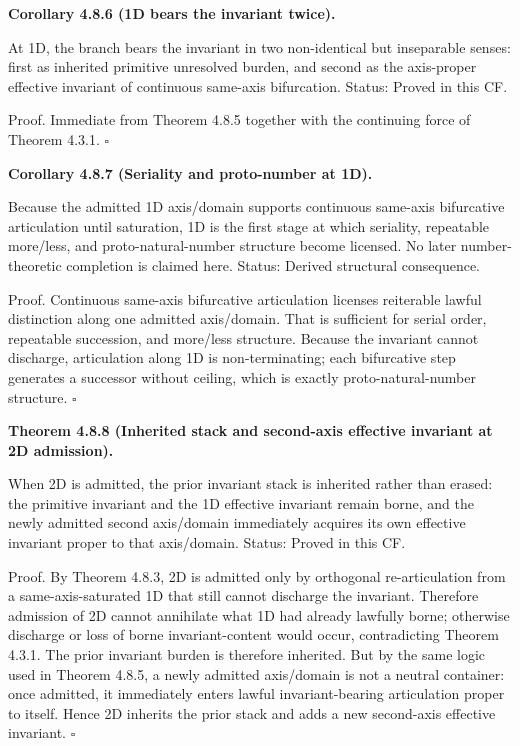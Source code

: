 \documentclass[11pt]{article}
\begin{document}
\textbf{Corollary 4.8.6 (1D bears the invariant twice).}

At 1D, the branch bears the invariant in two non-identical but inseparable senses: first as inherited primitive unresolved burden, and second as the axis-proper effective invariant of continuous same-axis bifurcation. Status: Proved in this CF.

Proof. Immediate from Theorem 4.8.5 together with the continuing force of Theorem 4.3.1. $\square$

\textbf{Corollary 4.8.7 (Seriality and proto-number at 1D).}

Because the admitted 1D axis/domain supports continuous same-axis bifurcative articulation until saturation, 1D is the first stage at which seriality, repeatable more/less, and proto-natural-number structure become licensed. No later number-theoretic completion is claimed here. Status: Derived structural consequence.

Proof. Continuous same-axis bifurcative articulation licenses reiterable lawful distinction along one admitted axis/domain. That is sufficient for serial order, repeatable succession, and more/less structure. Because the invariant cannot discharge, articulation along 1D is non-terminating; each bifurcative step generates a successor without ceiling, which is exactly proto-natural-number structure. $\square$

\textbf{Theorem 4.8.8 (Inherited stack and second-axis effective invariant at 2D admission).}

When 2D is admitted, the prior invariant stack is inherited rather than erased: the primitive invariant and the 1D effective invariant remain borne, and the newly admitted second axis/domain immediately acquires its own effective invariant proper to that axis/domain. Status: Proved in this CF.

Proof. By Theorem 4.8.3, 2D is admitted only by orthogonal re-articulation from a same-axis-saturated 1D that still cannot discharge the invariant. Therefore admission of 2D cannot annihilate what 1D had already lawfully borne; otherwise discharge or loss of borne invariant-content would occur, contradicting Theorem 4.3.1. The prior invariant burden is therefore inherited. But by the same logic used in Theorem 4.8.5, a newly admitted axis/domain is not a neutral container: once admitted, it immediately enters lawful invariant-bearing articulation proper to itself. Hence 2D inherits the prior stack and adds a new second-axis effective invariant. $\square$
\end{document}
